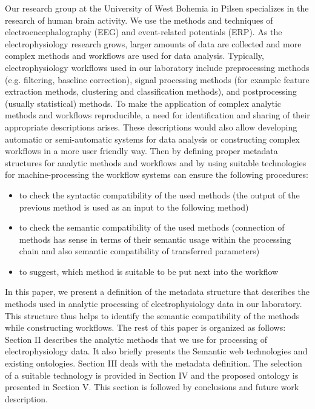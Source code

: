 \documentclass[a4paper,twoside]{article}
\begin{document}
\noindent Our research group at the University of West Bohemia in Pilsen
specializes in the research of human brain activity. We use the methods and techniques of electroencephalography (EEG) and event-related potentials (ERP). As the electrophysiology research grows, larger amounts of data are collected and more complex methods and workflows are used for data analysis. Typically, electrophysiology workflows used in our laboratory include preprocessing methods (e.g. filtering, baseline correction), signal processing methods (for example feature extraction methods, clustering and classification methods), and postprocessing (usually statistical) methods. To make the application of complex analytic methods and workflows reproducible, a need for identification and sharing of their appropriate descriptions arises. These descriptions would also allow developing automatic or semi-automatic systems for data analysis or constructing complex workflows in a more user friendly way. Then by defining proper metadata structures for analytic methods and workflows and by using suitable technologies for machine-processing the workflow systems can ensure the following procedures:

\begin{itemize}

\item to check the syntactic compatibility of the used methods (the output of the previous method is used as an input to the following method)
\item to check the semantic compatibility of the used methods (connection of methods has sense in terms of their semantic usage within the processing chain and also semantic compatibility of transferred parameters)
\item to suggest, which method is suitable to be put next into the workflow

\end{itemize}

In this paper, we present a definition of the metadata structure that describes the methods used in analytic processing of electrophysiology data in our laboratory. This structure thus helps to identify the semantic compatibility of the methods while constructing workflows. The rest of this paper is organized as follows: Section II describes the analytic methods that we use for processing of electrophysiology data. It also briefly presents the Semantic web technologies and existing ontologies. Section III deals with the metadata definition. The selection of a suitable technology is provided in Section IV and the proposed ontology is presented in Section V. This section is followed by conclusions and future work description.
\end{document}

